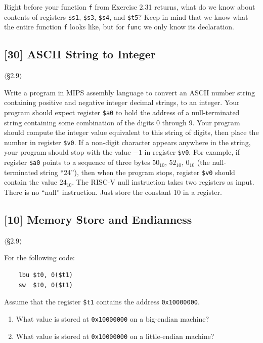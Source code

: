 \noindent Right before your function \texttt{f} from Exercise 2.31 returns,
what do we know about contents of registers \texttt{\$s1}, \texttt{\$s3},
\texttt{\$s4}, and \texttt{\$t5}? Keep in mind that we know what the entire
function \texttt{f} looks like, but for \texttt{func} we only know its
declaration.

\problembreak

\subsection{[30] ASCII String to Integer}
\hypertarget{prob-2.34}{}
\noindent$\langle$\S2.9$\rangle$\medskip

\noindent Write a program in MIPS assembly language to convert an ASCII number
string containing positive and negative integer decimal strings, to an
integer. Your program should expect register \texttt{\$a0} to hold the
address of a null-terminated string containing some combination of the digits
0 through 9. Your program should compute the integer value equivalent to this
string of digits, then place the number in register \texttt{\$v0}. If a
non-digit character appears anywhere in the string, your program should stop
with the value $-1$ in register \texttt{\$v0}. For example, if register
\texttt{\$a0} points to a sequence of three bytes
$50_{10}$, $52_{10}$, $0_{10}$ (the null-terminated string ``24''), then when
the program stops, register \texttt{\$v0} should contain the value $24_{10}$.
The RISC-V null instruction takes two registers as input.
There is no ``null'' instruction. Just store the constant 10 in a register.

\problembreak

\subsection{[10] Memory Store and Endianness}
\hypertarget{prob-2.35}{}
\noindent$\langle$\S2.9$\rangle$\medskip

\noindent For the following code:
\begin{verbatim}
    lbu $t0, 0($t1)
    sw  $t0, 0($t1)
\end{verbatim}

\noindent Assume that the register \texttt{\$t1} contains the address
\texttt{0x10000000}.

\begin{enumerate}
  \item[2.35.1] [5] What value is stored at \texttt{0x10000000} on a big-endian
        machine?
  \item[2.35.2] [5] What value is stored at \texttt{0x10000000} on a
        little-endian machine?
\end{enumerate}

